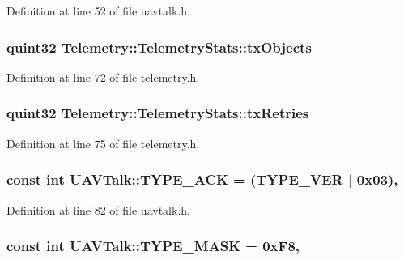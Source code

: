 Definition at line 52 of file uavtalk.\-h.

\hypertarget{group___u_a_v_talk_plugin_gaa7970a8185efea335e5cbe734739eca9}{
\subsubsection[{tx\-Objects}]{\setlength{\rightskip}{0pt plus 5cm}quint32 Telemetry\-::\-Telemetry\-Stats\-::tx\-Objects}}\label{group___u_a_v_talk_plugin_gaa7970a8185efea335e5cbe734739eca9}


Definition at line 72 of file telemetry.\-h.

\hypertarget{group___u_a_v_talk_plugin_ga071780b1d6a06aa36a41efaa190e97ec}{
\subsubsection[{tx\-Retries}]{\setlength{\rightskip}{0pt plus 5cm}quint32 Telemetry\-::\-Telemetry\-Stats\-::tx\-Retries}}\label{group___u_a_v_talk_plugin_ga071780b1d6a06aa36a41efaa190e97ec}


Definition at line 75 of file telemetry.\-h.

\hypertarget{group___u_a_v_talk_plugin_gaec2c5c58b05deb71a40e1248ff82aa52}{
\subsubsection[{T\-Y\-P\-E\-\_\-\-A\-C\-K}]{\setlength{\rightskip}{0pt plus 5cm}const {\bf int} U\-A\-V\-Talk\-::\-T\-Y\-P\-E\-\_\-\-A\-C\-K = (T\-Y\-P\-E\-\_\-\-V\-E\-R $|$ 0x03)\hspace{0.3cm}{\ttfamily [static]}, {\ttfamily [protected]}}}\label{group___u_a_v_talk_plugin_gaec2c5c58b05deb71a40e1248ff82aa52}


Definition at line 82 of file uavtalk.\-h.

\hypertarget{group___u_a_v_talk_plugin_gadad9ea7937a0ef8cf1a162fc2265e9c4}{
\subsubsection[{T\-Y\-P\-E\-\_\-\-M\-A\-S\-K}]{\setlength{\rightskip}{0pt plus 5cm}const {\bf int} U\-A\-V\-Talk\-::\-T\-Y\-P\-E\-\_\-\-M\-A\-S\-K = 0x\-F8\hspace{0.3cm}{\ttfamily [static]}, {\ttfamily [protected]}}}\label{group___u_a_v_talk_plugin_gadad9ea7937a0ef8cf1a162fc2265e9c4}


